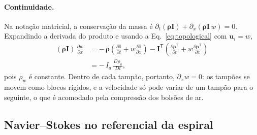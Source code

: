 \documentclass[aps,pre,twocolumn,superscriptaddress,nofootinbib,floatfix]{revtex4-2}
\begin{document}
\paragraph*{Continuidade.} Na notação matricial, a conservação da massa é $\partial_t(\bm\rho\mathbf I)+\partial_x(\bm\rho\mathbf I\,w)=0$. Expandindo a derivada do produto e usando a Eq.~\eqref{eq:topological} com $\bm u_i=w$,
\begin{align}
  (\bm\rho\mathbf I)\,\frac{\partial w}{\partial x}
  &= -\,\bm\rho\left(\frac{\partial\mathbf I}{\partial t}+w\frac{\partial\mathbf I}{\partial x}\right)
  - \mathbf I^{\mathsf T}\!\left(\frac{\partial\bm\rho^{\mathsf T}}{\partial t}+w\frac{\partial\bm\rho^{\mathsf T}}{\partial x}\right) \nonumber\\
  &= -\,I_a\,\frac{D\rho_a}{Dt},
  \label{eq:continuity}
\end{align}
pois $\rho_w$ é constante. Dentro de cada tampão, portanto, $\partial_xw=0$: os tampões se movem como blocos rígidos, e a velocidade só pode variar de um tampão para o seguinte, o que é acomodado pela compressão dos bolsões de ar.

\subsection{Navier--Stokes no referencial da espiral}
\end{document}
